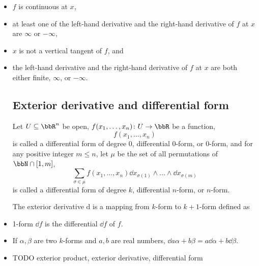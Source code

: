 \documentclass[a4paper,12pt]{report}
\begin{document}
\begin{itemize}
\begin{itemize}
\subsubsection{Corner or sharp corner}
A corner or sharp corner is a point $x$ on the graph of a real function $f$ such that $f$ is continuous but not differentiable at $x$ and that the left-hand derivative and the right-hand derivative of $f$ at $x$ both exist and are finite.
\subsubsection{Vertical tangent}
A vertical tangent is a point $x$ on the graph of a real function $f$ such that $f$ is continuous at $x$ and that the left-hand derivative and the right-hand derivative of $f$ at $x$ are both $\infty$ or are both $-\infty$.
\subsubsection{Cusp}
A cusp is a point $x$ on the graph of a real function $f$ such that:
\bit
\item $f$ is continuous at $x$,
\item at least one of the left-hand derivative and the right-hand derivative of $f$ at $x$ are $\infty$ or $-\infty$,
\item $x$ is not a vertical tangent of $f$, and
\item the left-hand derivative and the right-hand derivative of $f$ at $x$ are both either finite, $\infty$, or $-\infty$.
\eit
\subsection{Exterior derivative and differential form}
Let $U\subseteq\bbR^n$ be open, $f(x_1,\ldots,x_n)\colon U\to\bbR$ be a function,
\[f(x_1,\ldots,x_n)\]
is called a differential form of degree 0, differential 0-form, or 0-form, and for any positive integer $m\le n$, let $\mu$ be the set of all permutations of $\bbN\cap [1,m]$,
\[\sum_{\sigma\in\mu}f(x_1,\ldots,x_n)\dd{x}_{\sigma(1)}\wedge\ldots\wedge\dd{x}_{\sigma(m)}\]
is called a differential form of degree $k$, differential $n$-form, or $n$-form.

The exterior derivative $\mathrm{d}$ is a mapping from $k$-form to $k+1$-form defined as
\bit
\item 1-form $\dd{f}$ is the differential $\dd{f}$ of $f$.
\item If $\alpha,\beta$ are two $k$-forms and $a,b$ are real numbers, $\dd{a\alpha+b\beta}=a\dd{\alpha}+b\dd{\beta}$.
\item TODO
  exterior product, exterior derivative, differential form
\eit




\end{itemize}
\end{itemize}
\end{document}
